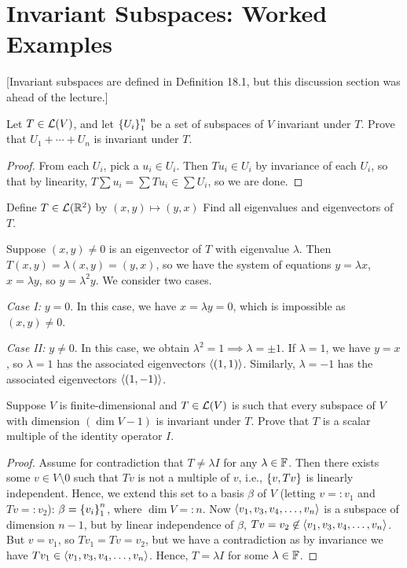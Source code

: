 \documentclass{article}
\begin{document}
\section{Invariant Subspaces: Worked Examples}
[Invariant subspaces are defined in Definition 18.1, but this discussion section was ahead of the lecture.]
\begin{example}
Let $T\in\mathcal L(V)$, and let $\left\{U_i\right\}_1^n$ be a set of subspaces of $V$ invariant under $T$. Prove that $U_1 + \cdots + U_n$ is invariant under $T$.
\end{example}
\begin{proof}
From each $U_i$, pick a $u_i\in U_i$. Then $Tu_i \in U_i$ by invariance of each $U_i$, so that by linearity, $T\sum u_i  = \sum Tu_i \in \sum U_i$, so we are done.
\end{proof}
\begin{example}
Define $T\in\mathcal L(\mathbb R^2)$ by $(x,y)\mapsto (y,x)$ Find all eigenvalues and eigenvectors of $T$.
\end{example}
\begin{solution}
Suppose $(x,y)\neq 0$ is an eigenvector of $T$ with eigenvalue $\lambda$. Then $T(x,y) = \lambda(x,y) = (y,x)$, so we have the system of equations $y = \lambda x$, $x=\lambda y$, so $y = \lambda^2y$. We consider two cases. \newpage

\textit{Case I:} $y=0$. In this case, we have $x=\lambda y = 0$, which is impossible as $(x,y)\neq 0$.

\textit{Case II:} $y\neq 0$. In this case, we obtain $\lambda^2 = 1\implies \lambda = \pm 1$. If $\lambda = 1$, we have $y=x$, so $\lambda = 1$ has the associated eigenvectors $\left\langle(1, 1)\right\rangle$. Similarly, $\lambda =- 1$ has the associated eigenvectors $\left\langle(1, -1)\right\rangle$.
\end{solution}
\begin{example}
Suppose $V$ is finite-dimensional and $T\in\mathcal L(V)$ is such that every subspace of $V$ with dimension $(\dim V-1)$ is invariant under $T$. Prove that $T$ is a scalar multiple of the identity operator $I$.
\end{example}
\begin{proof}
Assume for contradiction that $T\neq \lambda I$ for any $\lambda\in\mathbb F$. Then there exists some $v\in V\setminus 0$ such that $Tv$ is not a multiple of $v$, i.e., $\left\{v, Tv\right\}$ is linearly independent. Hence, we extend this set to a basis $\beta$ of $V$ (letting $v =: v_1$ and $Tv =: v_2$): $\beta = \left\{v_i\right\}_1^n$, where $\dim V =: n$. Now $\left\langle v_1, v_3, v_4, \ldots, v_n\right\rangle$ is a subspace of dimension $n-1$, but by linear independence of $\beta$, $Tv = v_2\not\in \left\langle v_1, v_3, v_4, \ldots, v_n\right\rangle$. But $v= v_1$, so $Tv_1 = Tv = v_2$, but we have a contradiction as by invariance we have $Tv_1 \in \left\langle v_1, v_3, v_4, \ldots, v_n\right\rangle$. Hence, $T = \lambda I$ for some $\lambda\in\mathbb F$.
\end{proof}
\end{document}
